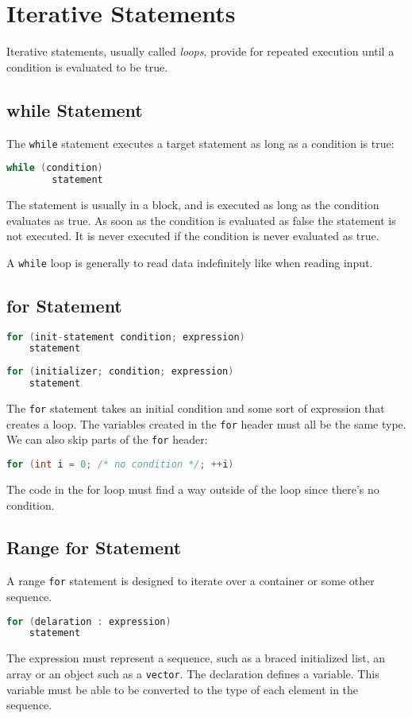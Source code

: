 \documentclass[12pt, a4paper]{report}
\begin{document}
\section{Iterative Statements}
Iterative statements, usually called \emph{loops}, provide for repeated execution until a condition is evaluated to be true.
\subsection{while Statement}
The \verb|while| statement executes a target statement as long as a condition is true:
\begin{lstlisting}[language=C++]
    while (condition)
        statement
\end{lstlisting}
The statement is usually in a block, and is executed as long as the condition evaluates as true.
As soon as the condition is evaluated as false the statement is not executed.
It is never executed if the condition is never evaluated as true.

A \verb|while| loop is generally to read data indefinitely like when reading input.

\subsection{for Statement}
\begin{lstlisting}[language=C++]
  for (init-statement condition; expression)
    statement
\end{lstlisting}
\begin{lstlisting}[language=C++]
  for (initializer; condition; expression)
    statement
\end{lstlisting}
The \verb|for| statement takes an initial condition and some sort of expression that creates a loop.
The variables created in the \verb|for| header must all be the same type.
We can also skip parts of the \verb|for| header:
\begin{lstlisting}[language=C++]
  for (int i = 0; /* no condition */; ++i)
\end{lstlisting}
The code in the for loop must find a way outside of the loop since there's no condition.

\subsection{Range for Statement}
A range \verb|for| statement is designed to iterate over a container or some other sequence.
\begin{lstlisting}[language=C++]
  for (delaration : expression)
    statement
\end{lstlisting}
The expression must represent a sequence, such as a braced initialized list, an array or an object such as a \verb|vector|.
The declaration defines a variable.
This variable must be able to be converted to the type of each element in the sequence.
\end{document}
